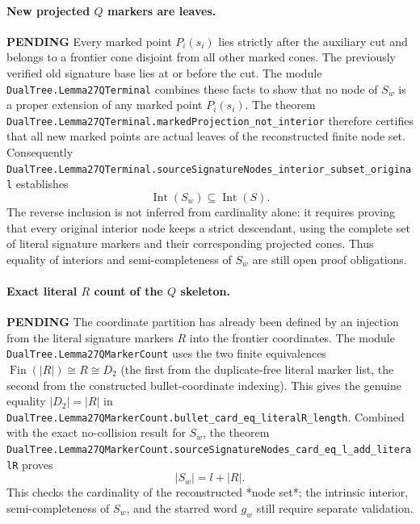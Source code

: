 \documentclass[11pt]{article}
\newcommand{\todo}{\textcolor{gray!70!black}{\textbf{PENDING}}}
\newcommand{\lean}[1]{\texttt{#1}}
\begin{document}
\paragraph{New projected $Q$ markers are leaves.} \todo
Every marked point $P_i(s_i)$ lies strictly after the auxiliary
cut and belongs to a frontier cone disjoint from all other
marked cones.  The previously verified old signature base lies
at or before the cut.  The module \lean{DualTree.Lemma27QTerminal}
combines these facts to show that no node of
$S_w$ is a proper extension of any marked point $P_i(s_i)$.
The theorem
\lean{DualTree.Lemma27QTerminal.markedProjection_not_interior}
therefore certifies that all new marked points are actual leaves
of the reconstructed finite node set.  Consequently
\lean{DualTree.Lemma27QTerminal.sourceSignatureNodes_interior_subset_original}
establishes
\[
  \operatorname{Int}(S_w)\subseteq\operatorname{Int}(S).
\]
The reverse inclusion is not inferred from cardinality alone:
it requires proving that every original interior node keeps
a strict descendant, using the complete set of literal
signature markers and their corresponding projected cones.
Thus equality of interiors and semi-completeness of $S_w$
are still open proof obligations.



\paragraph{Exact literal $R$ count of the $Q$ skeleton.} \todo
The coordinate partition has already been defined by an injection
from the literal signature markers $R$ into the frontier coordinates.
The module \lean{DualTree.Lemma27QMarkerCount} uses the two
finite equivalences
$\operatorname{Fin}(|R|)\cong R\cong D_2$
(the first from the duplicate-free literal marker list, the
second from the constructed bullet-coordinate indexing).
This gives the genuine equality $|D_2|=|R|$ in
\lean{DualTree.Lemma27QMarkerCount.bullet_card_eq_literalR_length}.
Combined with the exact no-collision result for $S_w$, the theorem
\lean{DualTree.Lemma27QMarkerCount.sourceSignatureNodes_card_eq_l_add_literalR}
proves
\[
   |S_w|=l+|R|.
\]
This checks the cardinality of the reconstructed *node set*;
the intrinsic interior, semi-completeness of $S_w$, and the
starred word $g_w$ still require separate validation.
\end{document}
